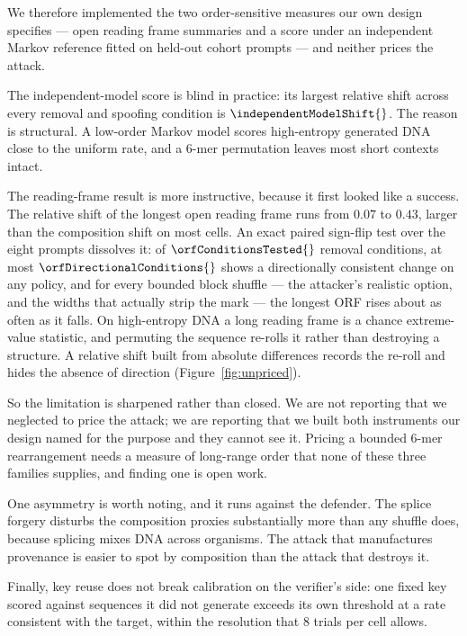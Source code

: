 We therefore implemented the two order-sensitive measures our own design specifies --- open reading
frame summaries and a score under an independent Markov reference fitted on held-out cohort prompts ---
and neither prices the attack.

The independent-model score is blind in practice: its largest relative shift across every removal and
spoofing condition is $\independentModelShift{}$. The reason is structural. A low-order Markov model
scores high-entropy generated DNA close to the uniform rate, and a 6-mer permutation leaves most short
contexts intact.

The reading-frame result is more instructive, because it first looked like a success. The relative
shift of the longest open reading frame runs from $0.07$ to $0.43$, larger than the composition shift
on most cells. An exact paired sign-flip test over the eight prompts dissolves it: of
$\orfConditionsTested{}$ removal conditions, at most $\orfDirectionalConditions{}$ shows a
directionally consistent change on any policy, and for every bounded block shuffle --- the attacker's
realistic option, and the widths that actually strip the mark --- the longest ORF rises about as often
as it falls. On high-entropy DNA a long reading frame is a chance extreme-value statistic, and
permuting the sequence re-rolls it rather than destroying a structure. A relative shift built from
absolute differences records the re-roll and hides the absence of direction
(Figure~\ref{fig:unpriced}).

So the limitation is sharpened rather than closed. We are not reporting that we neglected to price the
attack; we are reporting that we built both instruments our design named for the purpose and they
cannot see it. Pricing a bounded 6-mer rearrangement needs a measure of long-range order that none of
these three families supplies, and finding one is open work.

One asymmetry is worth noting, and it runs against the defender. The splice forgery disturbs the
composition proxies substantially more than any shuffle does, because splicing mixes DNA across
organisms. The attack that manufactures provenance is easier to spot by composition than the attack
that destroys it.

Finally, key reuse does not break calibration on the verifier's side: one fixed key scored against
sequences it did not generate exceeds its own threshold at a rate consistent with the target, within
the resolution that $8$ trials per cell allows.

